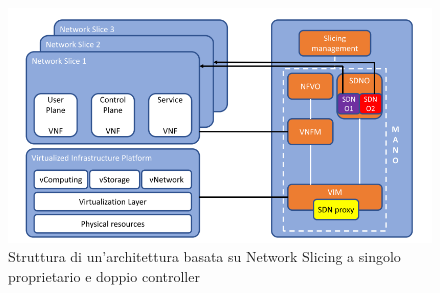 \begin{figure}
	\centering
	\includegraphics[width=0.9\linewidth]{../immagini/arch2}
	\caption[Architettura NS a doppio controller]{Struttura di un'architettura basata su Network Slicing a singolo proprietario e doppio controller}
	\label{fig:arch1}
\end{figure}

